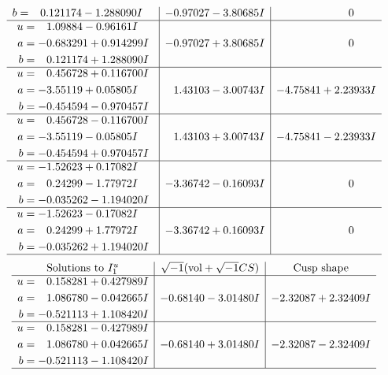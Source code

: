 \documentclass[1p]{elsarticle_modified}
\theoremstyle{definition}
\newcommand{\I}{\sqrt{-1}}
\begin{document}
$$\begin{array}{c|c|c}
\begin{aligned}
b &= \phantom{-}0.121174 - 1.288090 I\end{aligned}
 & -0.97027 - 3.80685 I & \phantom{-0.000000 } 0 \\ \hline\begin{aligned}
u &= \phantom{-}1.09884 - 0.96161 I \\
a &= -0.683291 + 0.914299 I \\
b &= \phantom{-}0.121174 + 1.288090 I\end{aligned}
 & -0.97027 + 3.80685 I & \phantom{-0.000000 } 0 \\ \hline\begin{aligned}
u &= \phantom{-}0.456728 + 0.116700 I \\
a &= -3.55119 + 0.05805 I \\
b &= -0.454594 - 0.970457 I\end{aligned}
 & \phantom{-}1.43103 - 3.00743 I & -4.75841 + 2.23933 I \\ \hline\begin{aligned}
u &= \phantom{-}0.456728 - 0.116700 I \\
a &= -3.55119 - 0.05805 I \\
b &= -0.454594 + 0.970457 I\end{aligned}
 & \phantom{-}1.43103 + 3.00743 I & -4.75841 - 2.23933 I \\ \hline\begin{aligned}
u &= -1.52623 + 0.17082 I \\
a &= \phantom{-}0.24299 - 1.77972 I \\
b &= -0.035262 - 1.194020 I\end{aligned}
 & -3.36742 - 0.16093 I & \phantom{-0.000000 } 0 \\ \hline\begin{aligned}
u &= -1.52623 - 0.17082 I \\
a &= \phantom{-}0.24299 + 1.77972 I \\
b &= -0.035262 + 1.194020 I\end{aligned}
 & -3.36742 + 0.16093 I & \phantom{-0.000000 } 0\\
 \hline 
 \end{array}$$\newpage$$\begin{array}{c|c|c}  
\text{Solutions to }I^u_{1}& \I (\text{vol} + \sqrt{-1}CS) & \text{Cusp shape}\\
 \hline 
\begin{aligned}
u &= \phantom{-}0.158281 + 0.427989 I \\
a &= \phantom{-}1.086780 - 0.042665 I \\
b &= -0.521113 + 1.108420 I\end{aligned}
 & -0.68140 - 3.01480 I & -2.32087 + 2.32409 I \\ \hline\begin{aligned}
u &= \phantom{-}0.158281 - 0.427989 I \\
a &= \phantom{-}1.086780 + 0.042665 I \\
b &= -0.521113 - 1.108420 I\end{aligned}
 & -0.68140 + 3.01480 I & -2.32087 - 2.32409 I\\
 \hline 
 \end{array}$$\newpage\newpage\renewcommand{\arraystretch}{1}
\end{document}
